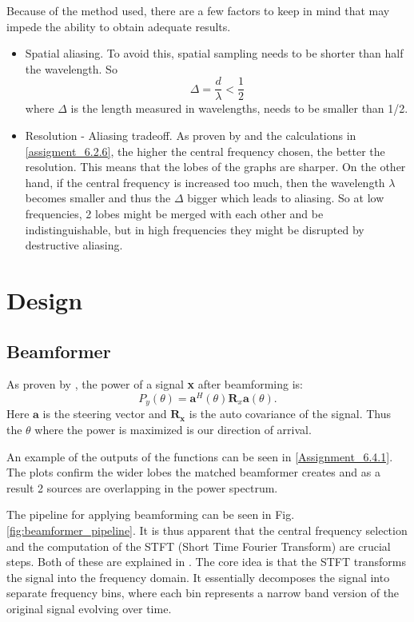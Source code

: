 Because of the method used, there are a few factors to keep in mind that may impede the ability to obtain adequate results.

\label{beamformer_assumption_constraints}
\begin{itemize}
    \item Spatial aliasing. To avoid this, spatial sampling needs to be shorter than half the wavelength. So \[
    \Delta = \frac{d}{\lambda} < \frac{1}{2}
    \] 
    where $\Delta$ is the length measured in wavelengths, needs to be smaller than 1/2.\label{aliasing}

    \item Resolution - Aliasing tradeoff. As proven by \cite{IP3Man} and the calculations in \ref{assigment_6.2.6}, the higher the central frequency chosen, the better the resolution. This means that the lobes of the graphs are sharper. On the other hand, if the central frequency is increased too much, then the wavelength $\lambda$ becomes smaller and thus the $\Delta$ bigger which leads to aliasing. So at low frequencies, 2 lobes might be merged with each other and be indistinguishable, but in high frequencies they might be disrupted by destructive aliasing.   

\end{itemize}

\section{Design}
\subsection{Beamformer}

As proven by \cite{IP3Man}, the power of a signal \textbf{x} after beamforming is: \[
P_y(\theta) = \mathbf{a}^H(\theta) \mathbf{R}_x \mathbf{a}(\theta)
.\]
Here $\mathbf{a}$ is the steering vector and $\mathbf{R_x}$ is the auto covariance of the signal.
Thus the $\theta$ where the power is maximized is our direction of arrival.


An example of the outputs of the functions can be seen in \ref{Assignment_6.4.1}. The plots confirm the wider lobes the matched beamformer creates and as a result 2 sources are overlapping in the power spectrum.

The pipeline for applying beamforming can be seen in Fig. \ref{fig:beamformer_pipeline}. It is thus apparent that the central frequency selection and the computation of the STFT (Short Time Fourier Transform) are crucial steps. Both of these are explained in \cite{IP3Man}. The core idea is that the STFT transforms the signal into the frequency domain. It essentially decomposes the signal into separate frequency bins, where each bin represents a narrow band version of the original signal evolving over time. 

